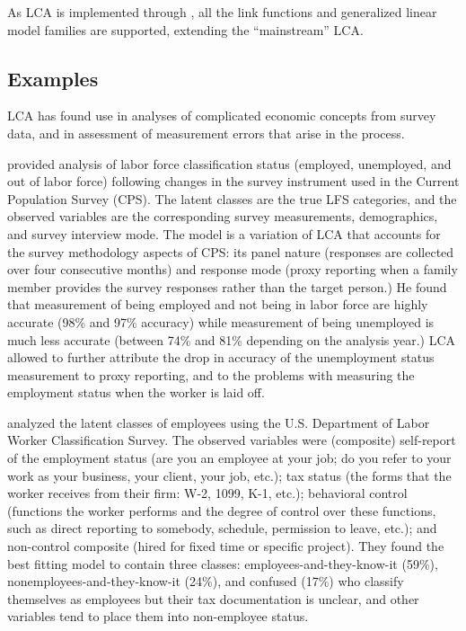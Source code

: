 As LCA is implemented through ,
all the link functions and generalized linear model families
are supported, extending the ``mainstream'' LCA.

\subsection{Examples }

LCA has found use in analyses of complicated economic concepts
from survey data, and in assessment of measurement errors
that arise in the process.

\citet{biemer:2004} provided analysis of labor force classification
status (employed, unemployed, and out of labor force) following changes
in the survey instrument used in the Current Population Survey (CPS).
The latent classes are the true 
LFS categories, and the observed variables are the corresponding 
survey measurements, demographics, and survey interview mode.
The model is a variation of LCA that accounts for the survey methodology
aspects of CPS: 
its panel nature (responses are collected over four consecutive months) 
and response mode (proxy reporting when a family member provides
the survey responses rather than the target person.)
He found that measurement of being employed and not being in labor force
are highly accurate (98\% and 97\% accuracy) while measurement of 
being unemployed is much less accurate (between 74\% and 81\% depending
on the analysis year.) LCA allowed to further attribute the drop in
accuracy of the unemployment status measurement to proxy reporting,
and to the problems with measuring the employment status when 
the worker is laid off.

\citet{kolenikov:daley:2017} analyzed the latent classes
of employees 
using the U.S. Department of Labor Worker Classification Survey.
The observed variables were (composite) 
self-report of the employment
status (are you an employee at your job; do you refer to your work
as your business, your client, your job, etc.); 
tax status
(the forms that the worker receives from their firm: W-2, 1099, K-1, etc.);
behavioral control 
(functions the worker performs and the degree of control over these functions,
such as direct reporting to somebody, schedule, permission to leave, etc.);
and non-control composite
(hired for fixed time or specific project). They found the best fitting
model to contain three classes: employees-and-they-know-it (59\%),
nonemployees-and-they-know-it (24\%), and confused (17\%) who
classify themselves as employees but their tax documentation
is unclear, and other variables tend to place them into non-employee status.

